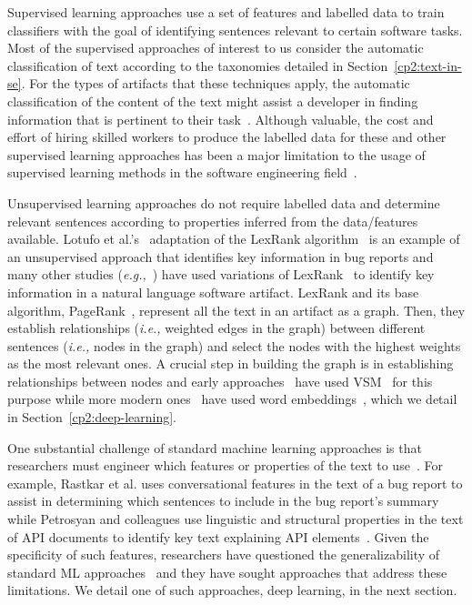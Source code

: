 Supervised learning approaches use a set of features and labelled data
 to train classifiers with the goal of identifying sentences relevant to 
 certain software tasks.
Most of the supervised approaches of interest to us  
consider the automatic classification of text according to the taxonomies 
detailed in Section~\ref{cp2:text-in-se}.
For the types of artifacts that these techniques apply, 
the automatic classification of the 
 content of the text 
might assist a developer 
in finding information that is pertinent to their task~\cite{fucci2019, Arya2019}.
Although valuable, the cost and effort of hiring skilled workers to produce 
the labelled data for these and other supervised learning approaches
has been a major limitation 
to the usage of supervised learning 
methods in the software engineering field~\cite{Arpteg2018}.



Unsupervised learning approaches do not require labelled data and determine 
relevant sentences according to properties inferred from the data/features available. 
Lotufo et al.'s~\cite{Lotufo2012} adaptation of the LexRank algorithm~\cite{Erkan2004} is an example of 
an unsupervised approach that identifies key information in bug reports
and many other studies (\textit{e.g.,}~\cite{Jiang2017, Ponzanelli2015,  Ponzanelli2017}) have used 
variations of LexRank~\cite{Erkan2004} to identify key information in a natural
language software artifact.
LexRank and its base algorithm, PageRank~\cite{Page1999}, represent all the text in an artifact as a graph.
Then, they establish relationships (\textit{i.e.,} weighted edges in the graph) 
between different sentences (\textit{i.e.,} nodes in the graph) 
and select the nodes with the highest weights as the most relevant ones.
A crucial step in building the graph is in  
establishing  relationships between nodes
and early approaches~\cite{Lotufo2012, Jiang2017} 
have used \ac{VSM}~\cite{Salton1975vsm} 
for this purpose while more modern ones~\cite{Huang2018, silva2019}
have used word embeddings~\cite{Mikolov2013, bojanowski2017FastText},
which we detail in Section~\ref{cp2:deep-learning}.




One substantial challenge of standard machine learning
approaches is that researchers must engineer which 
features or properties of the text to use~\cite{ferreira2021}.
For example, Rastkar et al. uses conversational features in 
the text of a bug report to assist in determining which sentences 
to include in the bug report's summary~\cite{Rastkar2010}
while Petrosyan and colleagues use 
linguistic and structural properties 
in the text of API documents to identify key text 
explaining API elements~\cite{Petrosyan2015}.
Given the specificity of such features, 
researchers have questioned the generalizability
of standard \acs{ML} approaches~\cite{Xiao2018, fucci2019}
and they have sought approaches that address these 
limitations. We detail one of such approaches, deep learning, in the next section.






